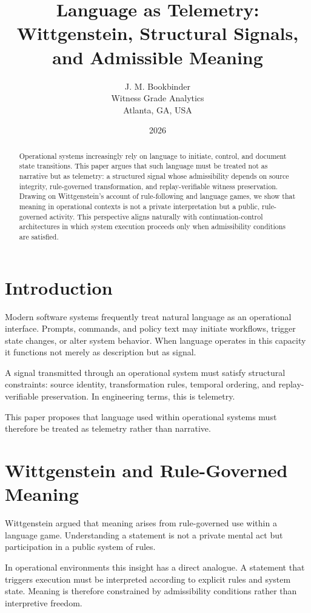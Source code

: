 \documentclass[11pt]{article}
\title{Language as Telemetry: Wittgenstein, Structural Signals, and Admissible Meaning}
\author{J. M. Bookbinder \\ Witness Grade Analytics \\ Atlanta, GA, USA}
\date{2026}
\begin{document}
\maketitle

\begin{abstract}
Operational systems increasingly rely on language to initiate, control, and document state transitions. 
This paper argues that such language must be treated not as narrative but as telemetry: a structured signal 
whose admissibility depends on source integrity, rule-governed transformation, and replay-verifiable witness preservation.
Drawing on Wittgenstein’s account of rule-following and language games, we show that meaning in operational contexts 
is not a private interpretation but a public, rule-governed activity. 
This perspective aligns naturally with continuation-control architectures in which system execution proceeds only when 
admissibility conditions are satisfied. 
\end{abstract}

\section{Introduction}

Modern software systems frequently treat natural language as an operational interface. 
Prompts, commands, and policy text may initiate workflows, trigger state changes, or alter system behavior. 
When language operates in this capacity it functions not merely as description but as signal.

A signal transmitted through an operational system must satisfy structural constraints:
source identity, transformation rules, temporal ordering, and replay-verifiable preservation. 
In engineering terms, this is telemetry. \cite{lamport1978,leveson2011}

This paper proposes that language used within operational systems must therefore be treated as telemetry rather than narrative.

\section{Wittgenstein and Rule-Governed Meaning}

Wittgenstein argued that meaning arises from rule-governed use within a language game. 
Understanding a statement is not a private mental act but participation in a public system of rules. \cite{wittgenstein1922,wittgenstein1953}

In operational environments this insight has a direct analogue. 
A statement that triggers execution must be interpreted according to explicit rules and system state. 
Meaning is therefore constrained by admissibility conditions rather than interpretive freedom.
\end{document}
